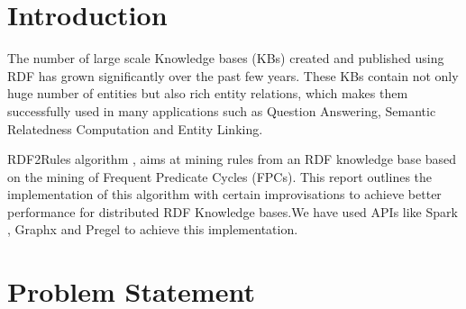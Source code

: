 \documentclass{easychair}
\begin{document}
\setcounter{tocdepth}{2}

%
%

\pagestyle{empty}


\section{Introduction}
\label{sec:intro}
The number of  large scale Knowledge bases (KBs) created and published using RDF has grown significantly over the past few years. These KBs contain not only huge number of entities but also rich entity relations, which makes them successfully used in many applications such as Question Answering, Semantic Relatedness Computation and Entity Linking.

RDF2Rules algorithm \cite{wang2015rdf2rules}, aims at mining rules from an RDF knowledge base based on the mining of Frequent Predicate Cycles (FPCs).  This report outlines the implementation of this algorithm with certain improvisations to achieve better performance for distributed RDF Knowledge bases.We have used APIs like Spark \cite{spark}, Graphx\cite{xin2013graphx} and Pregel\cite{malewicz2010pregel} to achieve this implementation.



\section{Problem Statement}
\end{document}
